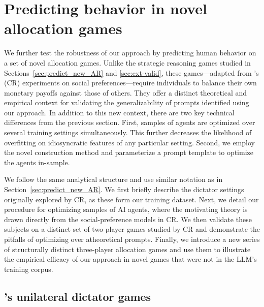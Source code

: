 \documentclass[11pt]{article}
\theoremstyle{definition}
\newcommand{\aisub}{AI agent}
\newcommand{\persona}{prompt}
\begin{document}
\renewcommand{\thefigure}{A\arabic{figure}} 
\setcounter{figure}{0}  

\renewcommand{\thetable}{A\arabic{table}} 
\setcounter{table}{0}  


\section{Predicting behavior in novel allocation games}
\label{app:predict_new_CR}

We further test the robustness of our approach by predicting human behavior on a set of novel allocation games.
Unlike the strategic reasoning games studied in Sections~\ref{sec:predict_new_AR} and \ref{sec:ext-valid}, these games---adapted from \cite{charness2002understanding}'s (CR) experiments on social preferences---require individuals to balance their own monetary payoffs against those of others. 
They offer a distinct theoretical and empirical context for validating the generalizability of \persona{s} identified using our approach.
In addition to this new context, there are two key technical differences from the previous section.
First, samples of agents are optimized over several training settings simultaneously.
This further decreases the likelihood of overfitting on idiosyncratic features of any particular setting.
Second, we employ the novel construction method and parameterize a prompt template to optimize the agents in-sample.

We follow the same analytical structure and use similar notation as in Section~\ref{sec:predict_new_AR}.
We first briefly describe the dictator settings originally explored by CR, as these form our training dataset. 
Next, we detail our procedure for optimizing samples of \aisub{s}, where the motivating theory is drawn directly from the social-preference models in CR. 
We then validate these subjects on a distinct set of two-player games studied by CR and demonstrate the pitfalls of optimizing over atheoretical \persona{s}.
Finally, we introduce a new series of structurally distinct three-player allocation games and use them to illustrate the empirical efficacy of our approach in novel games that were not in the LLM's training corpus.

\subsection{\cite{charness2002understanding}'s unilateral dictator games}
\label{sec:cr_app}
\end{document}
